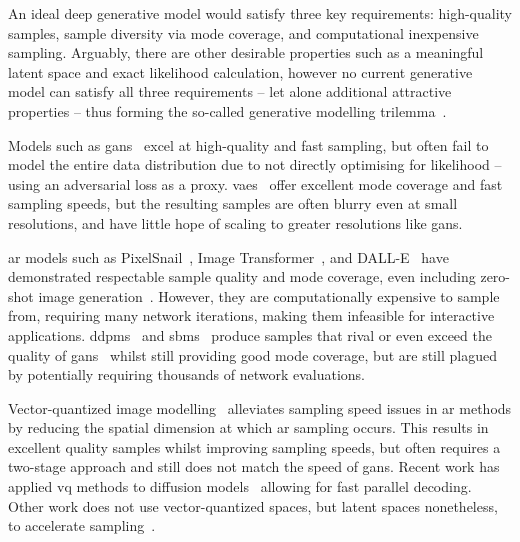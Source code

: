 
An ideal deep generative model would satisfy three key requirements:
high-quality samples, sample diversity via mode coverage, and computational
inexpensive sampling. Arguably, there are other desirable properties such as a
meaningful latent space and exact likelihood calculation, however no current
generative model can satisfy all three requirements -- let alone additional
attractive properties -- thus forming the so-called generative modelling
trilemma~\cite{xiao2021trilemma}.

Models such as \glspl{gan}~\cite{goodfellow2014gan}
excel at high-quality and fast sampling, but often fail to model the entire data
distribution due to not directly optimising for likelihood -- using an
adversarial loss as a proxy. \Glspl{vae}~\cite{kingma2013vae} offer
excellent mode coverage and fast sampling speeds, but the resulting samples are
often blurry even at small resolutions, and have little hope of scaling to
greater resolutions like \glspl{gan}.

\Gls{ar} models such as PixelSnail~\cite{chen2017snail}, Image
Transformer~\cite{parmar2018image}, and DALL-E~\cite{parmar2018image} have
demonstrated respectable sample quality and mode coverage, even including
zero-shot image generation~\cite{ramesh2021dalle}. However, they are
computationally expensive to sample from, requiring many network iterations,
making them infeasible for interactive applications. \Glspl{ddpm}~\cite{ho2020ddpm}
and \glspl{sbm}~\cite{song2019sbm,song2020sde,song2021mlt} produce
samples that rival or even exceed the quality of \glspl{gan}~\cite{dhariwal2021ddpm}
whilst still providing good mode coverage, but are still plagued by potentially
requiring thousands of network evaluations.

Vector-quantized image
modelling~\cite{oord2017vqvae,razavi2019generating,esser2021taming} alleviates
sampling speed issues in \gls{ar} methods by reducing the spatial dimension at
which \gls{ar} sampling occurs. This results in excellent quality samples whilst
improving sampling speeds, but often requires a two-stage approach and still
does not match the speed of \glspl{gan}. Recent work has applied \gls{vq}
methods to diffusion models~\cite{bondtaylor2021unleashing} allowing for fast
parallel decoding. Other work does not use vector-quantized spaces, but latent
spaces nonetheless, to accelerate
sampling~\cite{xiao2021trilemma,vahdat2021sbmlatent}.

